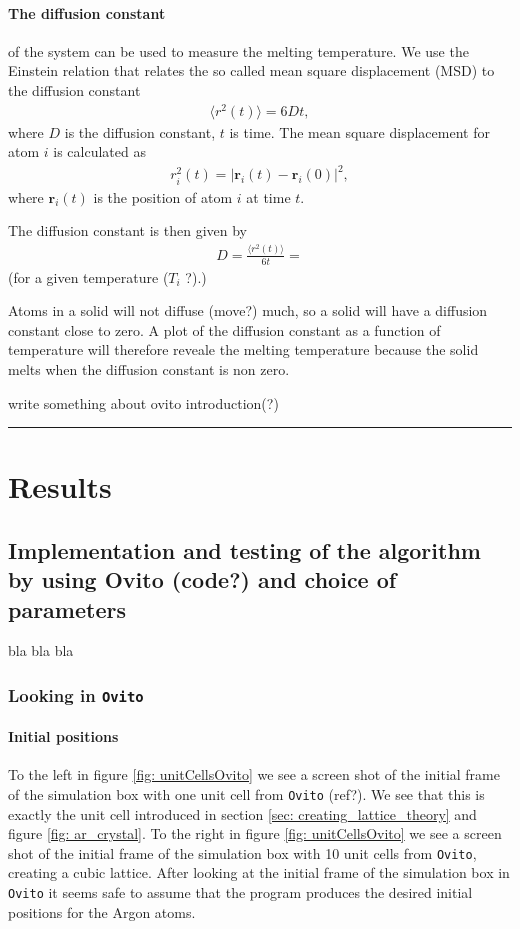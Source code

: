 \documentclass[11pt,a4wide]{article}
\renewcommand{\vec}{\mathbf}
\begin{document}
\paragraph{The diffusion constant} of the system can be used to measure the melting temperature. We use the Einstein relation that relates the so called mean square displacement (MSD) to the diffusion constant
\begin{align}
	\langle r^2(t) \rangle = 6Dt,
\end{align}
where $D$ is the diffusion constant, $t$ is time. The mean square displacement for atom $i$ is calculated as
\begin{align}
	r_i^2(t) = |\vec r_i(t) - \vec r_i(0)|^2,
\end{align}
where $\vec r_i(t)$ is the position of atom $i$ at time $t$. 

The diffusion constant is then given by
\begin{align*}
D = \frac{\langle r^2(t) \rangle}{6t} = 
\end{align*}
(for a given temperature ($T_i$ ?).)

Atoms in a solid will not diffuse (move?) much, so a solid will have a diffusion constant close to zero. A plot of the diffusion constant as a function of temperature will therefore reveale the melting temperature because the solid melts when the diffusion constant is non zero.

write something about ovito introduction(?)

\rule{0.3\textwidth}{0.4pt}\par %


\section{Results} %

\subsection{Implementation and testing of the algorithm by using Ovito (code?) and choice of parameters}
bla bla bla

\subsubsection*{Looking in \texttt{Ovito}}
\paragraph{Initial positions}
To the left in figure \ref{fig: unitCellsOvito} we see a screen shot of the initial frame of the simulation box with one unit cell from \texttt{Ovito} (ref?). We see that this is exactly the unit cell introduced in section \ref{sec: creating_lattice_theory} and figure \ref{fig: ar_crystal}. To the right in figure \ref{fig: unitCellsOvito} we see a screen shot of the initial frame of the simulation box with 10 unit cells from \texttt{Ovito}, creating a cubic lattice. After looking at the initial frame of the simulation box in \texttt{Ovito} it seems safe to assume that the program produces the desired initial positions for the Argon atoms. 
\end{document}
